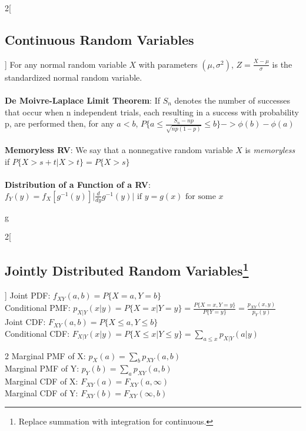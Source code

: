 \documentclass{article}
\begin{document}
    \begin{multicols}{2}[\subsection*{Continuous Random Variables}]
	For any normal random variable $X$ with parameters $(\mu, \sigma^2)$, $Z = \frac{X - \mu}{\sigma}$ is the standardized normal random variable.\\ \\
	\textbf{De Moivre-Laplace Limit Theorem}: If $S_n$ denotes the number of successes that occur when n independent trials, each resulting in a success with probability p, are performed then, for any $a < b$, $P\{a \leq \frac{S_n -np}{\sqrt{np(1 -p)}} \leq b\} -> \phi(b) - \phi(a)$ \\ \\
	\textbf{Memoryless RV}: We say that a nonnegative random variable $X$ is \emph{memoryless} if $P\{X >s + t \vert X > t\} = P\{X > s\}$\\ \\
	\textbf{Distribution of a Function of a RV}: $f_Y(y) = f_X[g^{-1}(y)] \vert{\frac{d}{dy}g^{-1}(y)}\vert \text{  if } y = g(x) \text{ for some } x$
    \end{multicols}
g\vspace{-3em}
	\begin{multicols}{2}[\subsection*{Jointly Distributed Random Variables\footnote{Replace summation with integration for continuous.}}]
    Joint PDF: $f_{XY}(a,b) = P\{X = a, Y= b\}$\\
    Conditional PMF: $p_{X \vert Y}(x \vert y) = P\{X = x \vert Y = y\} = \frac{P\{X = x, Y = y\}}{P\{Y = y\}} = \frac{p_{XY}(x,y)}{p_Y(y)}$\\
    Joint CDF: $F_{XY}(a,b) = P\{X \leq a, Y \leq b\}$\\
    Conditional CDF: $F_{X \vert Y}(x \vert y) = P\{X \leq x \vert Y \leq y\} = \sum_{a \leq x} p_{X \vert Y}(a \vert y) $
    \end{multicols}
    \begin{multicols}{2}
    Marginal PMF of X: $p_X(a) = \sum_{b}p_{XY}(a,b)$\\
    Marginal PMF of Y: $p_Y(b) = \sum_{a}p_{XY}(a,b)$\\
    Marginal CDF of X: $F_{XY}(a) = F_{XY}(a,\infty)$\\
    Marginal CDF of Y: $F_{XY}(b) = F_{XY}(\infty, b)$
    \end{multicols}
	
\end{document}
